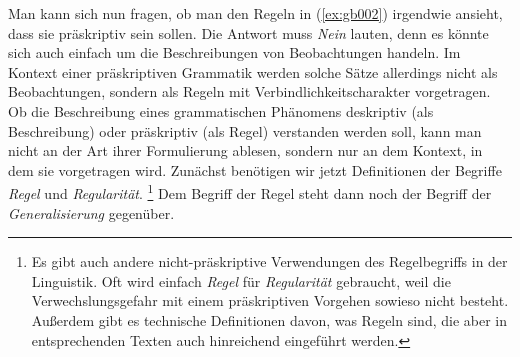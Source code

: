 \begin{exe}
  \ex\label{ex:gb002}
  \begin{xlist}
  \end{xlist}
\end{exe}

Man kann sich nun fragen, ob man den Regeln in (\ref{ex:gb002}) irgendwie ansieht, dass sie präskriptiv sein sollen.
Die Antwort muss \textit{Nein} lauten, denn es könnte sich auch einfach um die Beschreibungen von Beobachtungen handeln.
Im Kontext einer präskriptiven Grammatik werden solche Sätze allerdings nicht als Beobachtungen, sondern als Regeln mit Verbindlichkeitscharakter vorgetragen.
Ob die Beschreibung eines grammatischen Phänomens deskriptiv (als Beschreibung) oder präskriptiv (als Regel) verstanden werden soll, kann man nicht an der Art ihrer Formulierung ablesen, sondern nur an dem Kontext, in dem sie vorgetragen wird.
Zunächst benötigen wir jetzt Definitionen der Begriffe \textit{Regel} und \textit{Regularität}.%
\footnote{Es gibt auch andere nicht-präskriptive Verwendungen des Regelbegriffs in der Linguistik.
Oft wird einfach \textit{Regel} für \textit{Regularität} gebraucht, weil die Verwechslungsgefahr mit einem präskriptiven Vorgehen sowieso nicht besteht.
Außerdem gibt es technische Definitionen davon, was Regeln sind, die aber in entsprechenden Texten auch hinreichend eingeführt werden.}
Dem Begriff der Regel steht dann noch der Begriff der \textit{Generalisierung} gegenüber.




